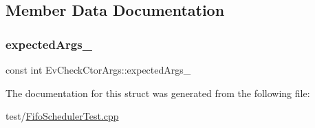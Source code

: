 \subsection{Member Data Documentation}
\mbox{\label{struct_ev_check_ctor_args_a6c8beab5e90ea1802c8b53a1f87cb5d5}} 
\subsubsection{\texorpdfstring{expected\+Args\+\_\+}{expectedArgs\_}}
{\footnotesize\ttfamily const int Ev\+Check\+Ctor\+Args\+::expected\+Args\+\_\+}



The documentation for this struct was generated from the following file\+:\begin{DoxyCompactItemize}
\item 
test/\mbox{\hyperlink{_fifo_scheduler_test_8cpp}{Fifo\+Scheduler\+Test.\+cpp}}\end{DoxyCompactItemize}
